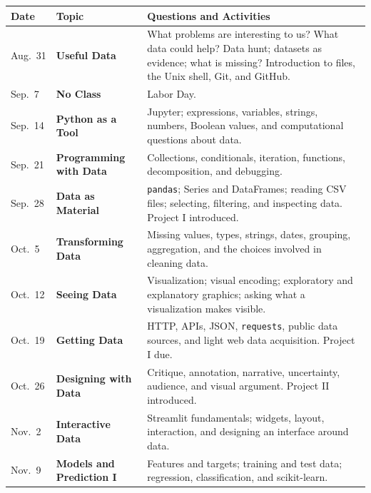 \documentclass[11pt]{article}
\begin{document}
\renewcommand{\arraystretch}{1.18}
\begin{tabularx}{\textwidth}{@{}p{}p{}X@{}}
\toprule
\textbf{Date} & \textbf{Topic} & \textbf{Questions and Activities} \\
\midrule

Aug.\ 31 &
\textbf{Useful Data} &
What problems are interesting to us? What data could help? Data hunt;
datasets as evidence; what is missing? Introduction to files, the Unix shell,
Git, and GitHub. \\

Sep.\ 7 &
\textbf{No Class} &
Labor Day. \\

Sep.\ 14 &
\textbf{Python as a Tool} &
Jupyter; expressions, variables, strings, numbers, Boolean values, and
computational questions about data. \\

Sep.\ 21 &
\textbf{Programming with Data} &
Collections, conditionals, iteration, functions, decomposition, and
debugging. \\

Sep.\ 28 &
\textbf{Data as Material} &
\texttt{pandas}; Series and DataFrames; reading CSV files; selecting,
filtering, and inspecting data. Project I introduced. \\

Oct.\ 5 &
\textbf{Transforming Data} &
Missing values, types, strings, dates, grouping, aggregation, and the choices
involved in cleaning data. \\

Oct.\ 12 &
\textbf{Seeing Data} &
Visualization; visual encoding; exploratory and explanatory graphics;
asking what a visualization makes visible. \\

Oct.\ 19 &
\textbf{Getting Data} &
HTTP, APIs, JSON, \texttt{requests}, public data sources, and light web data
acquisition. Project I due. \\

Oct.\ 26 &
\textbf{Designing with Data} &
Critique, annotation, narrative, uncertainty, audience, and visual argument.
Project II introduced. \\

Nov.\ 2 &
\textbf{Interactive Data} &
Streamlit fundamentals; widgets, layout, interaction, and designing an
interface around data. \\

Nov.\ 9 &
\textbf{Models and Prediction I} &
Features and targets; training and test data; regression, classification, and
scikit-learn. \\


\end{tabularx}
\end{document}
